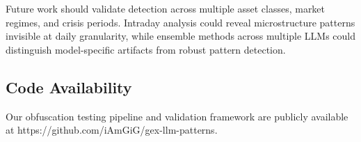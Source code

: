 Future work should validate detection across multiple asset classes, market regimes, and crisis periods. Intraday analysis could reveal microstructure patterns invisible at daily granularity, while ensemble methods across multiple LLMs could distinguish model-specific artifacts from robust pattern detection.

\subsection{Code Availability}
Our obfuscation testing pipeline and validation framework are publicly available at https://github.com/iAmGiG/gex-llm-patterns.